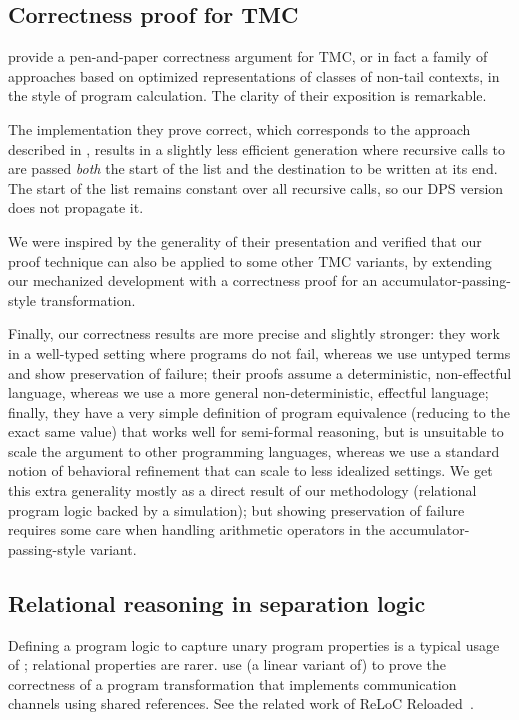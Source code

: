 \subsection{Correctness proof for TMC}

\citet*{tmc-koka-2023} provide a pen-and-paper correctness argument for TMC, or in fact a family of approaches based on optimized representations of classes of non-tail contexts, in the style of program calculation.
The clarity of their exposition is remarkable.

The implementation they prove correct, which corresponds to the approach described in \citet*{minamide-98}, results in a slightly less efficient generation where recursive calls to  are passed \emph{both} the start of the list and the destination to be written at its end.
The start of the list remains constant over all recursive calls, so our DPS version does not propagate it.

We were inspired by the generality of their presentation and verified that our proof technique can also be applied to some other TMC variants, by extending our mechanized development with a correctness proof for an
accumulator-passing-style transformation.

Finally, our correctness results are more precise and slightly stronger: they work in a well-typed setting where programs do not fail, whereas we use untyped terms and show preservation of failure; their proofs assume a deterministic, non-effectful language, whereas we use a more general non-deterministic, effectful language; finally, they have a very simple definition of program equivalence (reducing to the exact same value) that works well for semi-formal reasoning, but is unsuitable to scale the argument to other programming languages, whereas we use a standard notion of behavioral refinement that can scale to less idealized settings.
%
We get this extra generality mostly as a direct result of our methodology (relational program logic backed by a simulation); but showing preservation of failure requires some care when handling arithmetic operators in the accumulator-passing-style variant.

\subsection{Relational reasoning in separation logic}

Defining a program logic to capture unary program properties is a typical usage of \Iris; relational properties are rarer. \citet*{tassarotti-2017} use (a linear variant of) \Iris to prove the correctness of a program transformation that implements communication channels using shared references. See the related work of ReLoC Reloaded~\citep*{reloc-2021}.

